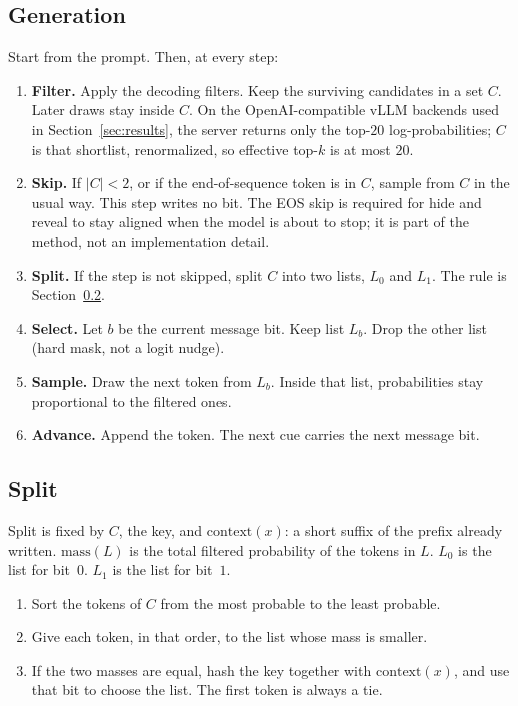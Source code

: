 \documentclass[11pt]{article}
\begin{document}
\subsection{Generation}
\label{sec:gen}

Start from the prompt.
Then, at every step:

\begin{enumerate}
\item \textbf{Filter.} Apply the decoding filters. Keep the surviving candidates in a set $C$. Later draws stay inside $C$.
On the OpenAI-compatible vLLM backends used in Section~\ref{sec:results}, the server returns only the top-$20$ log-probabilities; $C$ is that shortlist, renormalized, so effective top-$k$ is at most $20$.
\item \textbf{Skip.} If $|C|<2$, or if the end-of-sequence token is in $C$, sample from $C$ in the usual way. This step writes no bit.
The EOS skip is required for hide and reveal to stay aligned when the model is about to stop; it is part of the method, not an implementation detail.
\item \textbf{Split.} If the step is not skipped, split $C$ into two lists, $L_0$ and $L_1$. The rule is Section~\ref{sec:split}.
\item \textbf{Select.} Let $b$ be the current message bit. Keep list $L_b$. Drop the other list (hard mask, not a logit nudge).
\item \textbf{Sample.} Draw the next token from $L_b$. Inside that list, probabilities stay proportional to the filtered ones.
\item \textbf{Advance.} Append the token. The next cue carries the next message bit.
\end{enumerate}

\subsection{Split}
\label{sec:split}

Split is fixed by $C$, the key, and $\mathrm{context}(x)$: a short suffix of the prefix already written.
$\mathrm{mass}(L)$ is the total filtered probability of the tokens in $L$.
$L_0$ is the list for bit~$0$. $L_1$ is the list for bit~$1$.

\begin{enumerate}
\item Sort the tokens of $C$ from the most probable to the least probable.
\item Give each token, in that order, to the list whose mass is smaller.
\item If the two masses are equal, hash the key together with $\mathrm{context}(x)$, and use that bit to choose the list. The first token is always a tie.
\end{enumerate}
\end{document}
